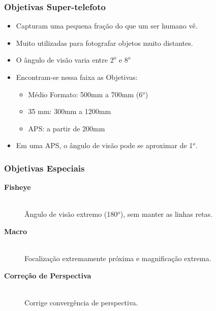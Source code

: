 \begin{frame}
    \frametitle{Objetivas Super-telefoto}
    \begin{itemize}
        \item Capturam uma pequena fração do que um ser humano vê.
        \item Muito utilizadas para fotografar objetos muito distantes.
        \item O ângulo de visão varia entre $2^o$ e $8^o$
        \item Encontram-se nessa faixa as Objetivas:

        {\small \begin{itemize}
            \item Médio Formato: 500mm a 700mm (6$^o$)
            \item 35 mm: 300mm a 1200mm
            \item APS: a partir de 200mm
        \end{itemize}}
        \item Em uma APS, o ângulo de visão pode se aproximar de 1$^o$.
    \end{itemize}
\end{frame}





\begin{frame}
    \frametitle{Objetivas Especiais}
    \begin{description}
        \item[\textbf{Fisheye}] \hfill \\ Ângulo de visão extremo (180$^o$), sem manter as linhas retas.
        \item[\textbf{Macro}] \hfill \\ Focalização extremamente próxima e magnificação extrema.
        \item[\textbf{Correção de Perspectiva}] \hfill \\ Corrige convergência de perspectiva.
    \end{description}
\end{frame}



